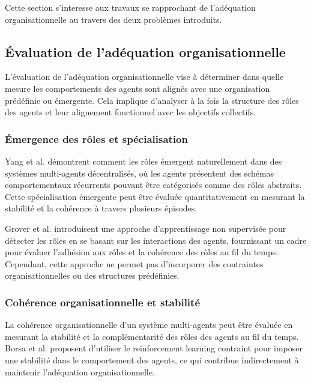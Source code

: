 \documentclass[sigconf,anonymous]{aamas}
\begin{document}
Cette section s'interesse aux travaux se rapprochant de l'adéquation organisationnelle au travers des deux problèmes introduits.


\subsection{Évaluation de l'adéquation organisationnelle}
L'évaluation de l'adéquation organisationnelle vise à déterminer dans quelle mesure les comportements des agents sont alignés avec une organisation prédéfinie ou émergente. Cela implique d'analyser à la fois la structure des rôles des agents et leur alignement fonctionnel avec les objectifs collectifs.

\subsubsection{Émergence des rôles et spécialisation}
Yang et al. \cite{yang2021role} démontrent comment les rôles émergent naturellement dans des systèmes multi-agents décentralisés, où les agents présentent des schémas comportementaux récurrents pouvant être catégorisés comme des rôles abstraits. Cette spécialisation émergente peut être évaluée quantitativement en mesurant la stabilité et la cohérence à travers plusieurs épisodes.

Grover et al. \cite{grover2018role} introduisent une approche d'apprentissage non supervisée pour détecter les rôles en se basant sur les interactions des agents, fournissant un cadre pour évaluer l'adhésion aux rôles et la cohérence des rôles au fil du temps. Cependant, cette approche ne permet pas d'incorporer des contraintes organisationnelles ou des structures prédéfinies.

\subsubsection{Cohérence organisationnelle et stabilité}
La cohérence organisationnelle d'un système multi-agents peut être évaluée en mesurant la stabilité et la complémentarité des rôles des agents au fil du temps. Borsa et al. \cite{borsa2019constrained} proposent d'utiliser le reinforcement learning contraint pour imposer une stabilité dans le comportement des agents, ce qui contribue indirectement à maintenir l'adéquation organisationnelle.
\end{document}
